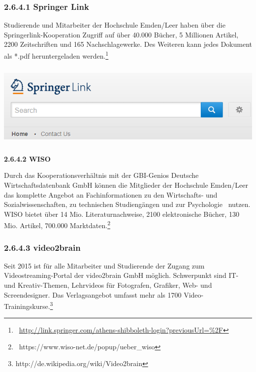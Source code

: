 \documentclass[a4paper]{article}
\makeatletter
\newcommand\textstyleAbsatzStandardschriftart[1]{#1}
\newcommand\captionof[1]{\def\@captype{#1}\caption}
\makeatother
\begin{document}
\subsubsection[2.6.4.1 Springer Link]{\bfseries\color{black} 2.6.4.1 Springer Link}
{\sffamily\mdseries\color{black}
Studierende und Mitarbeiter der Hochschule Emden/Leer haben über die Springerlink-Kooperation Zugriff auf über 40.000
Bücher, 5 Millionen Artikel, 2200 Zeitschriften und 165 Nachschlagewerke. Des Weiteren kann jedes Dokument als *.pdf
heruntergeladen werden.\footnote{\ \url{http://link.springer.com/athens-shibboleth-login?previousUrl=\%2F}}}


\bigskip

\includegraphics[width=15.476cm,height=4.152cm]{EntwurfKapitel2Gruppe220150528VW-img/EntwurfKapitel2Gruppe220150528VW-img012.png}
\captionof{figure}[SpringerLink Startseite]{SpringerLink Startseite}


{\sffamily\bfseries\color{black}
2.6.4.2 WISO}

{\sffamily\mdseries\color{black}
Durch das Kooperationsverhältnis mit der GBI-Genios Deutsche Wirtschaftsdatenbank GmbH können die Mitglieder der
Hochschule Emden/Leer das komplette Angebot an Fachinformationen zu den Wirtschafts- und Sozialwissenschaften, zu
technischen Studiengängen und zur Psychologie \ nutzen. WISO bietet über 14 Mio. Literaturnachweise, 2100 elektronische
Bücher, 130 Mio. Artikel, 700.000 Marktdaten.\footnote{\ https://www.wiso-net.de/popup/ueber\_wiso}}

\subsubsection{2.6.4.3 video2brain}
{\sffamily\mdseries\color{black}
\textstyleAbsatzStandardschriftart{Seit 2015 ist für alle Mitarbeiter und Studierende der Zugang zum
Videostreaming-Portal der video2brain GmbH möglich. Schwerpunkt sind IT- und Kreativ-Themen, Lehrvideos für Fotografen,
Grafiker, Web- und Screendesigner. Das Verlagsangebot umfasst mehr als 1700
Video-Trainingskurse.}\footnote{http://de.wikipedia.org/wiki/Video2brain}}
\end{document}
